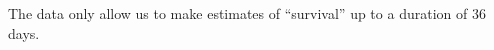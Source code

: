 \documentclass[a4paper,12pt]{article}
\begin{document}
The data only allow us to make estimates of “survival” up to a duration of 36
days.

\end{document}
